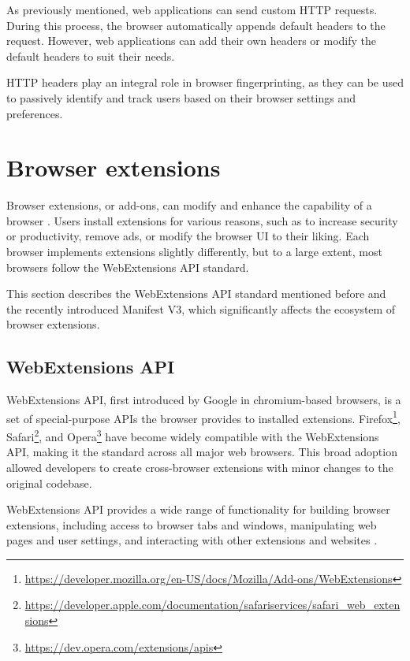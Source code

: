 As previously mentioned, web applications can send custom HTTP requests. During this process, the browser automatically appends default headers to the request. However, web applications can add their own headers or modify the default headers to suit their needs.

HTTP headers play an integral role in browser fingerprinting, as they can be used to passively identify and track users based on their browser settings and preferences. 

\section{Browser extensions}
\label{Section:Extensions}

Browser extensions, or add-ons, can modify and enhance the capability of a browser \cite{MDNWebExtensions}. Users install extensions for various reasons, such as to increase security or productivity, remove ads, or modify the browser UI to their liking. Each browser implements extensions slightly differently, but to a large extent, most browsers follow the WebExtensions API standard.

This section describes the WebExtensions API standard mentioned before and the recently introduced Manifest V3, which significantly affects the ecosystem of browser extensions.

\subsection{WebExtensions API}

WebExtensions API, first introduced by Google in chromium-based browsers, is a set of special-purpose APIs the browser provides to installed extensions. Firefox\footnote{\url{https://developer.mozilla.org/en-US/docs/Mozilla/Add-ons/WebExtensions}}, Safari\footnote{\url{https://developer.apple.com/documentation/safariservices/safari_web_extensions}}, and Opera\footnote{\url{https://dev.opera.com/extensions/apis}} have become widely compatible with the WebExtensions API, making it the standard across all major web browsers. This broad adoption allowed developers to create cross-browser extensions with minor changes to the original codebase.

WebExtensions API provides a wide range of functionality for building browser extensions, including access to browser tabs and windows, manipulating web pages and user settings, and interacting with other extensions and websites \cite{ChromeWebExtensions}.

